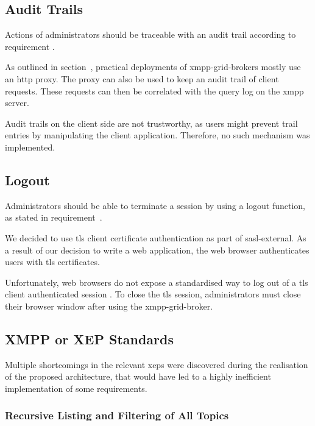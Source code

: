 \subsection{Audit Trails}

Actions of administrators should be traceable with an audit trail according to requirement .

As outlined in section~, practical deployments of \glspl{xmpp-grid-broker} mostly use an \gls{http} proxy.
The proxy can also be used to keep an audit trail of client requests.
These requests can then be correlated with the query log on the \gls{xmpp} server.

Audit trails on the client side are not trustworthy, as users might prevent trail entries by manipulating the client application.
Therefore, no such mechanism was implemented.

\subsection{Logout}

Administrators should be able to terminate a session by using a logout function, as stated in requirement~.

We decided to use \gls{tls} client certificate authentication as part of \gls{sasl-external}.
As a result of our decision to write a web application, the web browser authenticates users with \gls{tls} certificates.

Unfortunately, web browsers do not expose a standardised way to log out of a \gls{tls} client authenticated session \cite{practical-issues-with-tls-client}.
To close the \gls{tls} session, administrators must close their browser window after using the \gls{xmpp-grid-broker}.

\subsection{XMPP or XEP Standards}

Multiple shortcomings in the relevant \glspl{xep} were discovered during the realisation of the proposed architecture, that would have led to a highly inefficient implementation of some requirements.

\subsubsection{Recursive Listing and Filtering of All Topics}

